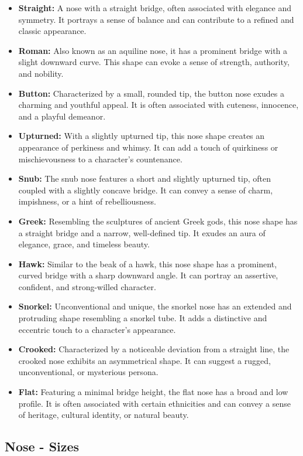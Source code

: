 \begin{itemize}
    \item \textbf{Straight:} A nose with a straight bridge, often associated with elegance and symmetry. It portrays a sense of balance and can contribute to a refined and classic appearance.
    \item \textbf{Roman:} Also known as an aquiline nose, it has a prominent bridge with a slight downward curve. This shape can evoke a sense of strength, authority, and nobility.
    \item \textbf{Button:} Characterized by a small, rounded tip, the button nose exudes a charming and youthful appeal. It is often associated with cuteness, innocence, and a playful demeanor.
    \item \textbf{Upturned:} With a slightly upturned tip, this nose shape creates an appearance of perkiness and whimsy. It can add a touch of quirkiness or mischievousness to a character's countenance.
    \item \textbf{Snub:} The snub nose features a short and slightly upturned tip, often coupled with a slightly concave bridge. It can convey a sense of charm, impishness, or a hint of rebelliousness.
    \item \textbf{Greek:} Resembling the sculptures of ancient Greek gods, this nose shape has a straight bridge and a narrow, well-defined tip. It exudes an aura of elegance, grace, and timeless beauty.
    \item \textbf{Hawk:} Similar to the beak of a hawk, this nose shape has a prominent, curved bridge with a sharp downward angle. It can portray an assertive, confident, and strong-willed character.
    \item \textbf{Snorkel:} Unconventional and unique, the snorkel nose has an extended and protruding shape resembling a snorkel tube. It adds a distinctive and eccentric touch to a character's appearance.
    \item \textbf{Crooked:} Characterized by a noticeable deviation from a straight line, the crooked nose exhibits an asymmetrical shape. It can suggest a rugged, unconventional, or mysterious persona.
    \item \textbf{Flat:} Featuring a minimal bridge height, the flat nose has a broad and low profile. It is often associated with certain ethnicities and can convey a sense of heritage, cultural identity, or natural beauty.
\end{itemize}

\subsection{\textbf{Nose - Sizes}}

